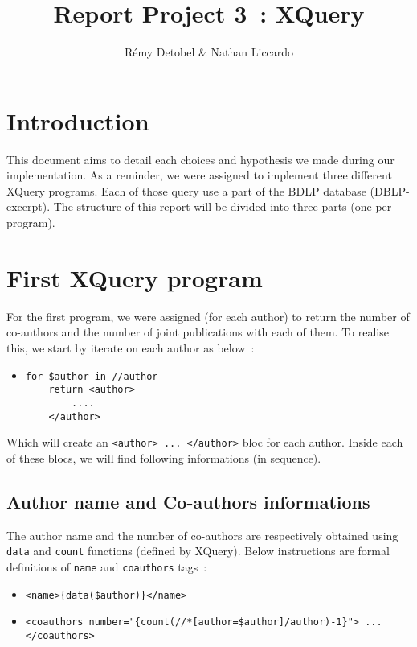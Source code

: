 \documentclass{article}
\author{R\'emy Detobel \& Nathan Liccardo}
\title{Report Project 3~: XQuery}
\begin{document}
\maketitle

\section{Introduction}
  This document aims to detail each choices and hypothesis we made during our implementation. As a reminder, we were assigned to implement three different XQuery programs. Each of those query use a part of the BDLP database (DBLP-excerpt). The structure of this report will be divided into three parts (one per program).

\section{First XQuery program}
  For the first program, we were assigned (for each author) to return the number of co-authors and the number of joint publications with each of them. To realise this, we start by iterate on each author as below~: 
  \begin{itemize}
    \item \begin{verbatim}
for $author in //author
    return <author>
        ....
    </author>\end{verbatim}
  \end{itemize}
  Which will create an \verb|<author> ... </author>| bloc for each author. Inside each of these blocs, we will find following informations (in sequence).
  
  \subsection{Author name and Co-authors informations}
    The author name and the number of co-authors are respectively obtained using \verb|data| and \verb|count| functions (defined by XQuery). Below instructions are formal definitions of \verb|name| and \verb|coauthors| tags~:
    \begin{itemize}
      \item \verb|<name>{data($author)}</name>|
      \item \verb|<coauthors number="{count(//*[author=$author]/author)-1}"> ... </coauthors>|
    \end{itemize}
    
\end{document}
